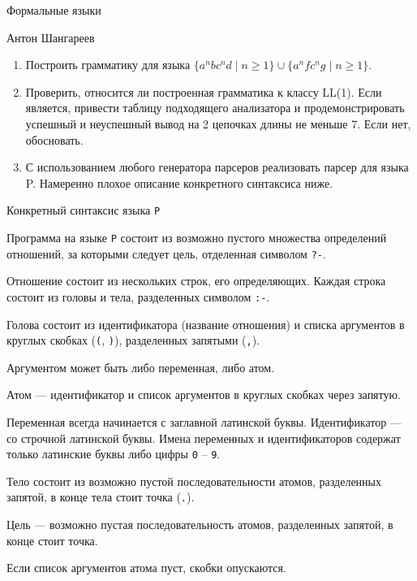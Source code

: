 \documentclass[12pt]{article}
\begin{document}
\begin{center}
{\LARGE Формальные языки}

\bigskip

{\Large Антон Шангареев}
\end{center} 

\bigskip

\begin{enumerate}
  \item Построить грамматику для языка $\{ a^n b c^n d \mid n \geq 1 \} \cup \{ a^n f c^n g \mid n \geq 1 \}$.
  \item Проверить, относится ли построенная грамматика к классу LL(1). Если является, привести таблицу подходящего анализатора и продемонстрировать успешный и неуспешный вывод на 2 цепочках длины не меньше 7. Если нет, обосновать.
  \item С использованием любого генератора парсеров реализовать парсер для языка P. Намеренно плохое описание конкретного синтаксиса ниже.
\end{enumerate}

\begin{center}
    \Large{Конкретный синтаксис языка \verb!P!}
\end{center}

Программа на языке \verb!P! состоит из возможно пустого множества определений отношений, за которыми следует цель, отделенная символом \verb!?-!.

Отношение состоит из нескольких строк, его определяющих. 
Каждая строка состоит из головы и тела, разделенных символом \verb!:-!. 

Голова состоит из идентификатора (название отношения) и списка аргументов в круглых скобках (\verb!(!, \verb!)!), разделенных запятыми (\verb!,!). 

Аргументом может быть либо переменная, либо атом. 

Атом --- идентификатор и список аргументов в круглых скобках через запятую. 

Переменная всегда начинается с заглавной латинской буквы. Идентификатор --- со строчной латинской буквы.
Имена переменных и идентификаторов содержат только латинские буквы либо цифры \verb!0! -- \verb!9!.

Тело состоит из возможно пустой последовательности атомов, разделенных запятой, в конце тела стоит точка (\verb!.!).

Цель --- возможно пустая последовательность атомов, разделенных запятой, в конце стоит точка. 

Если список аргументов атома пуст, скобки опускаются. 
\end{document}
